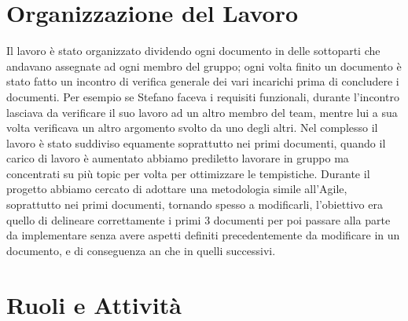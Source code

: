 \documentclass{article}
\begin{document}
\newpage

\section{Organizzazione del Lavoro}
Il lavoro è stato organizzato dividendo ogni documento in delle sottoparti che andavano assegnate ad ogni membro del gruppo; ogni volta finito un documento è stato fatto un incontro di verifica generale  dei vari incarichi prima di concludere i documenti.
Per esempio se Stefano faceva i requisiti funzionali, durante l'incontro lasciava da verificare il suo lavoro ad un altro membro del team, mentre lui a sua volta verificava un altro argomento svolto da uno degli altri.
Nel complesso il lavoro è stato suddiviso equamente soprattutto nei primi documenti,  quando il carico di lavoro è aumentato abbiamo prediletto lavorare in gruppo ma concentrati su più topic per volta per ottimizzare le tempistiche.
Durante il progetto abbiamo cercato di adottare una metodologia simile all'Agile, soprattutto nei primi documenti, tornando spesso a modificarli, l'obiettivo era quello di delineare correttamente i primi 3 documenti per poi passare alla parte da implementare senza avere aspetti definiti precedentemente da modificare in un documento, e di conseguenza an che in quelli successivi.

\section{Ruoli e Attività}
\end{document}
